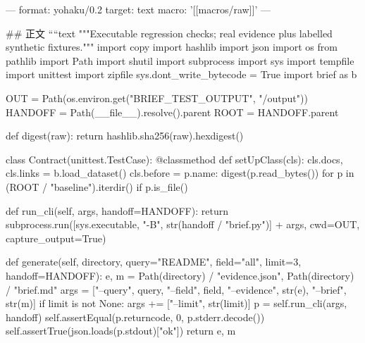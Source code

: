 ---
format: yohaku/0.2
target: text
macro: '[[macros/raw]]'
---

## 正文
````text
"""Executable regression checks; real evidence plus labelled synthetic fixtures."""
import copy
import hashlib
import json
import os
from pathlib import Path
import shutil
import subprocess
import sys
import tempfile
import unittest
import zipfile
sys.dont_write_bytecode = True
import brief as b

OUT = Path(os.environ.get("BRIEF_TEST_OUTPUT", "/output"))
HANDOFF = Path(__file__).resolve().parent
ROOT = HANDOFF.parent


def digest(raw):
    return hashlib.sha256(raw).hexdigest()


class Contract(unittest.TestCase):
    @classmethod
    def setUpClass(cls):
        cls.docs, cls.links = b.load_dataset()
        cls.before = {p.name: digest(p.read_bytes()) for p in (ROOT / "baseline").iterdir() if p.is_file()}

    def run_cli(self, args, handoff=HANDOFF):
        return subprocess.run([sys.executable, "-B", str(handoff / "brief.py")] + args,
                              cwd=OUT, capture_output=True)

    def generate(self, directory, query="README", field="all", limit=3, handoff=HANDOFF):
        e, m = Path(directory) / "evidence.json", Path(directory) / "brief.md"
        args = ["--query", query, "--field", field, "--evidence", str(e), "--brief", str(m)]
        if limit is not None:
            args += ["--limit", str(limit)]
        p = self.run_cli(args, handoff)
        self.assertEqual(p.returncode, 0, p.stderr.decode())
        self.assertTrue(json.loads(p.stdout)["ok"])
        return e, m

